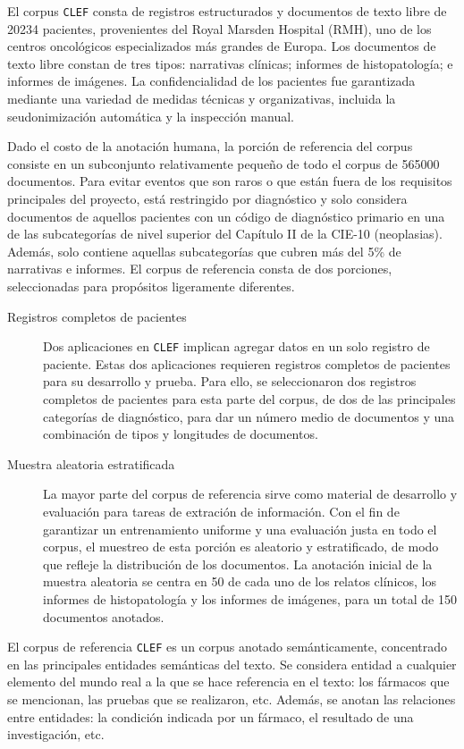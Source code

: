 El corpus \texttt{CLEF} consta de registros estructurados y documentos de texto libre de 20234 pacientes, provenientes del Royal Marsden Hospital (RMH), uno de los centros oncológicos especializados más grandes de Europa.
Los documentos de texto libre constan de tres tipos: narrativas clínicas; informes de histopatología; e informes de imágenes.
La confidencialidad de los pacientes fue garantizada mediante una variedad de medidas técnicas y organizativas, incluida la seudonimización automática y la inspección manual.

Dado el costo de la anotación humana, la porción de referencia del corpus consiste en un subconjunto relativamente pequeño de todo el corpus de 565000 documentos.
Para evitar eventos que son raros o que están fuera de los requisitos principales del proyecto, está restringido por diagnóstico y solo considera documentos de aquellos pacientes con un código de diagnóstico primario en una de las subcategorías de nivel superior del Capítulo II de la CIE-10 (neoplasias).
Además, solo contiene aquellas subcategorías que cubren más del 5\% de narrativas e informes.
El corpus de referencia consta de dos porciones, seleccionadas para propósitos ligeramente diferentes.

\begin{description}
  \item[Registros completos de pacientes]
        Dos aplicaciones en \texttt{CLEF} implican agregar datos en un solo registro de paciente.
        Estas dos aplicaciones requieren registros completos de pacientes para su desarrollo y prueba.
        Para ello, se seleccionaron dos registros completos de pacientes para esta parte del corpus, de dos de las principales categorías de diagnóstico, para dar un número medio de documentos y una combinación de tipos y longitudes de documentos.
  \item[Muestra aleatoria estratificada]
        La mayor parte del corpus de referencia sirve como material de desarrollo y evaluación para tareas de extración de información.
        Con el fin de garantizar un entrenamiento uniforme y una evaluación justa en todo el corpus, el muestreo de esta porción es aleatorio y estratificado, de modo que refleje la distribución de los documentos.
        La anotación inicial de la muestra aleatoria se centra en 50 de cada uno de los relatos clínicos, los informes de histopatología y los informes de imágenes, para un total de 150 documentos anotados.
\end{description}

El corpus de referencia \texttt{CLEF} es un corpus anotado semánticamente, concentrado en las principales entidades semánticas del texto.
Se considera entidad a cualquier elemento del mundo real a la que se hace referencia en el texto: los fármacos que se mencionan, las pruebas que se realizaron, etc.
Además, se anotan las relaciones entre entidades: la condición indicada por un fármaco, el resultado de una investigación, etc.

